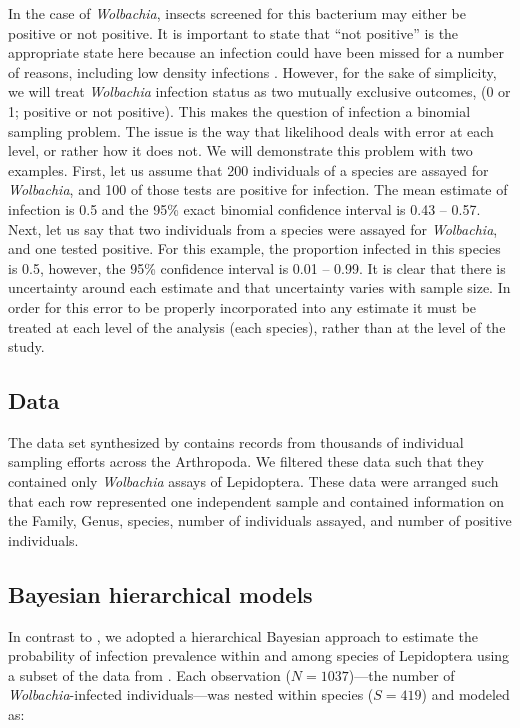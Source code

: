 \documentclass[12pt]{article}
\begin{document}
In the case of \textit{Wolbachia}, insects screened for this bacterium may either be positive or not positive. It is important to state that “not positive” is the appropriate state here because an infection could have been missed for a number of reasons, including low density infections \citep{Schneider:2014jv}. However, for the sake of simplicity, we will treat \textit{Wolbachia} infection status as two mutually exclusive outcomes, (0 or 1; positive or not positive). This makes the question of infection a binomial sampling problem. The issue is the way that likelihood deals with error at each level, or rather how it does not. We will demonstrate this problem with two examples. First, let us assume that 200 individuals of a species are assayed for \textit{Wolbachia}, and 100 of those tests are positive for infection. The mean estimate of infection is 0.5 and the 95\% exact binomial confidence interval is 0.43 – 0.57. Next, let us say that two individuals from a species were assayed for \textit{Wolbachia}, and one tested positive. For this example, the proportion infected in this species is 0.5, however, the 95\% confidence interval is 0.01 – 0.99. It is clear that there is uncertainty around each estimate and that uncertainty varies with sample size. In order for this error to be properly incorporated into any estimate it must be treated at each level of the analysis (each species), rather than at the level of the study. 

\subsection{Data}
The data set synthesized by \citet{Weinert:2015aa} contains records from thousands of individual sampling efforts across the Arthropoda. We filtered these data such that they contained only  \textit{Wolbachia} assays of Lepidoptera. These data were arranged such that each row represented one independent sample and contained information on the Family, Genus, species, number of individuals assayed, and number of positive individuals.

\subsection{Bayesian hierarchical models}
	In contrast to \cite{Ahmed:2015aa}, we adopted a hierarchical Bayesian approach to estimate the probability of infection prevalence within and among species of Lepidoptera using a subset of the data from \cite{Weinert:2015aa}. Each observation ($N=1037$)---the number of \emph{Wolbachia}-infected individuals---was nested within species ($S=419$) and  modeled as:
\end{document}
